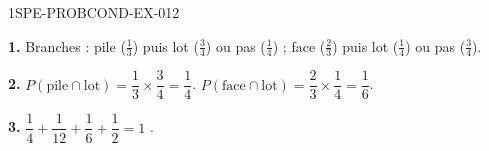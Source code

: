 \begin{corrige}{1SPE-PROBCOND-EX-012}

\textbf{1.} Branches : pile ($\frac{1}{3}$) puis lot ($\frac{3}{4}$) ou pas ($\frac{1}{4}$) ; face ($\frac{2}{3}$) puis lot ($\frac{1}{4}$) ou pas ($\frac{3}{4}$).

\medskip
\textbf{2.} $P(\text{pile} \cap \text{lot}) = \dfrac{1}{3} \times \dfrac{3}{4} = \dfrac{1}{4}$. $P(\text{face} \cap \text{lot}) = \dfrac{2}{3} \times \dfrac{1}{4} = \dfrac{1}{6}$.

\medskip
\textbf{3.} $\dfrac{1}{4} + \dfrac{1}{12} + \dfrac{1}{6} + \dfrac{1}{2} = 1$ \checkmark.

\end{corrige}
